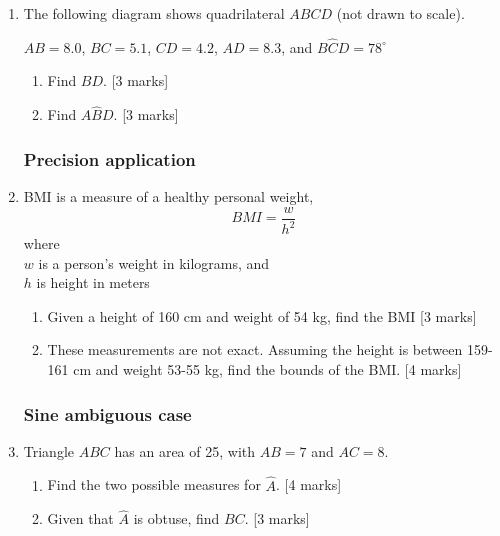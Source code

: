 \documentclass[12pt, twoside]{article}
\begin{document}
\begin{enumerate}
\newpage
  \item The following diagram shows quadrilateral $ABCD$ (not drawn to scale).
  \begin{center}
    \end{center} 
    $AB=8.0$, $BC=5.1$, $CD=4.2$, $AD=8.3$, and $B\hat{C}D=78^\circ$
    \begin{enumerate}
      \item Find $BD$. \hfill [3 marks]
      \item Find $A\hat{B}D$. \hfill [3 marks]
    \end{enumerate}

\newpage
\subsubsection*{Precision application}
  \item BMI is a measure of a healthy personal weight, 
  \[\displaystyle BMI = \frac{w}{h^2}\]
    where \\
    $w$ is a person's weight in kilograms, and \\
    $h$ is height in meters
    \begin{enumerate} 
        \item Given a height of 160 cm and weight of 54 kg, find the BMI  \hfill [3 marks]
        \item These measurements are not exact. Assuming the height is between 159-161 cm and weight 53-55 kg, find the bounds of the BMI.  \hfill [4 marks]
      \end{enumerate}

\newpage
\subsubsection*{Sine ambiguous case}
  \item Triangle $ABC$ has an area of 25, with $AB=7$ and $AC=8$. 
  \begin{enumerate}
    \item Find the two possible measures for $\hat{A}$. \hfill [4 marks]
    \item Given that $\hat{A}$ is obtuse, find $BC$. \hfill [3 marks]
  \end{enumerate}


\end{enumerate}
\end{document}
